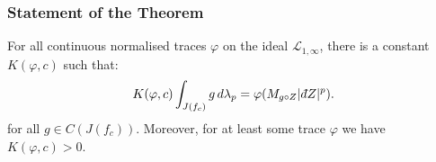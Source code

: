\documentclass{beamer} %
\theoremstyle{definition} %
\newcommand{\Lc}{\mathcal{L}}
\def\qd{\,{\mathchar'26\mkern-12mu d}}
\begin{document}
\begin{frame}\frametitle{Statement of the Theorem}
    For all continuous normalised traces $\varphi$ on the ideal $\Lc_{1,\infty}$, there is a constant $K(\varphi,c)$ such that:
    \begin{equation*}
        K(\varphi,c)\int_{J(f_c)} g\,d\lambda_p = \varphi(M_{g\circ Z}|\qd Z|^p).
    \end{equation*}
    for all $g \in C(J(f_c))$.
    Moreover, for at least some trace $\varphi$ we have $K(\varphi,c) > 0$.
\end{frame}
% 
\end{document}
